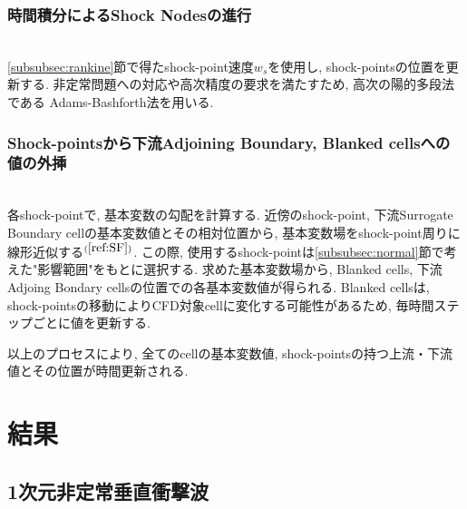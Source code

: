 \documentclass[a4j]{jarticle}
\begin{document}
\subsubsection{時間積分によるShock Nodesの進行} \label{subsubsec:prop}
\mbox{}\\[-1.0ex]

\ref{subsubsec:rankine}節で得たshock-point速度$w_s$を使用し, shock-pointsの位置を更新する.
非定常問題への対応や高次精度の要求を満たすため, 高次の陽的多段法である
Adams-Bashforth法を用いる.

\subsubsection{Shock-pointsから下流Adjoining Boundary, Blanked cellsへの値の外挿} \label{subsubsec:adjoining}
\mbox{}\\[-1.0ex]

各shock-pointで, 基本変数の勾配を計算する.
近傍のshock-point, 下流Surrogate Boundary cellの基本変数値とその相対位置から, 
基本変数場をshock-point周りに線形近似する$^{(\ref{ref:SF})}$.
この際, 使用するshock-pointは\ref{subsubsec:normal}節で考えた"影響範囲"をもとに選択する.
求めた基本変数場から, Blanked cells, 下流Adjoing Bondary cellsの位置での各基本変数値が得られる.
Blanked cellsは, shock-pointsの移動によりCFD対象cellに変化する可能性があるため,
毎時間ステップごとに値を更新する.

以上のプロセスにより, 全てのcellの基本変数値, shock-pointsの持つ上流・下流値とその位置が時間更新される.

\section{結果}
\subsection{1次元非定常垂直衝撃波}\label{subsec:1D}
\mbox{}\\[-3.0ex]
\end{document}
